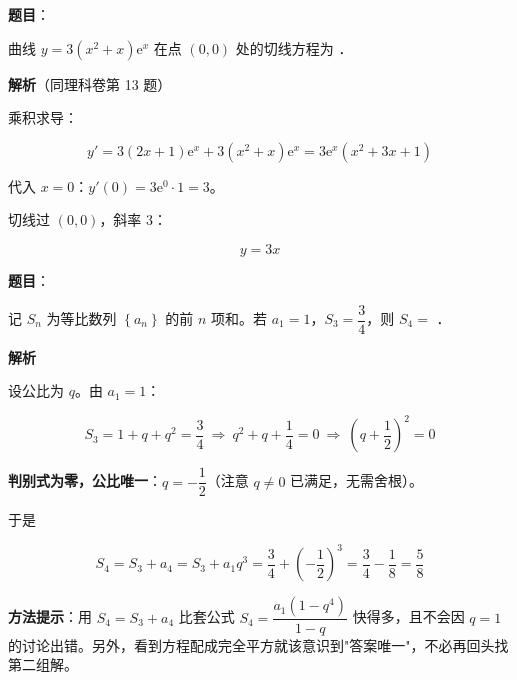 \begin{answer}

\textbf{题目}：

曲线 $y=3\left(x^{2}+x\right)\mathrm e^{x}$ 在点 $(0,0)$ 处的切线方程为 \gkblank{}．

\textbf{解析}（同理科卷第 13 题）

乘积求导：

\nopagebreak[4]
\[y'=3(2x+1)\mathrm e^{x}+3\left(x^{2}+x\right)\mathrm e^{x}=3\mathrm e^{x}\left(x^{2}+3x+1\right)\]

代入 $x=0$：$y'(0)=3\mathrm e^{0}\cdot1=3$。

切线过 $(0,0)$，斜率 $3$：

\nopagebreak[4]
\[y=3x\]


\par\medskip

\end{answer}
\begin{answer}

\textbf{题目}：

记 $S_n$ 为等比数列 $\left\{a_n\right\}$ 的前 $n$ 项和。若 $a_1=1$，$S_3=\dfrac34$，则 $S_4=$ \gkblank{}．

\textbf{解析}

设公比为 $q$。由 $a_1=1$：

\nopagebreak[4]
\[S_3=1+q+q^{2}=\frac34\ \Longrightarrow\ q^{2}+q+\frac14=0\ \Longrightarrow\ \left(q+\frac12\right)^{2}=0\]

\textbf{判别式为零，公比唯一}：$q=-\dfrac12$（注意 $q\ne0$ 已满足，无需舍根）。

于是

\nopagebreak[4]
\[S_4=S_3+a_4=S_3+a_1q^{3}=\frac34+\left(-\frac12\right)^{3}=\frac34-\frac18=\frac58\]

\begin{gktip}
\textbf{方法提示}：用 $S_4=S_3+a_4$ 比套公式 $S_4=\dfrac{a_1\left(1-q^{4}\right)}{1-q}$ 快得多，且不会因 $q=1$ 的讨论出错。另外，看到方程配成完全平方就该意识到"答案唯一"，不必再回头找第二组解。
\end{gktip}


\par\medskip

\end{answer}
